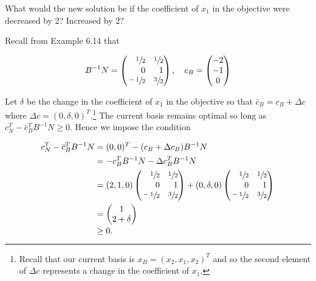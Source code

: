 What would the new solution be if the coefficient of $x_1$ in the objective were decreased by 2? Increased by 2?

\begin{solution}
  Recall from Example 6.14 that

  $$
  B^{-1} N = \begin{pmatrix*}[r]
     \sfrac{1}{2} & \sfrac{1}{2} \\
                0 &            1 \\
     \sfrac{-1}{2} & \sfrac{3}{2}
  \end{pmatrix*}, \quad c_B = \begin{pmatrix*}
    -2 \\
    -1 \\
     0
  \end{pmatrix*}
  $$

  Let $\delta$ be the change in the coefficient of $x_1$ in the objective so that $\bar{c}_B = c_B + \Delta c$ where 
  $\Delta c = (0, \delta, 0)^T$.\footnote{
    Recall that our current basis is $x_B = (x_2, x_1, x_2)^T$ and so the second element of $\Delta c$ represents a 
    change in the coefficient of $x_1$.
  } The current basis remains optimal so long as \linebreak
  $c_N^T - \bar{c}_B^T B^{-1} N \ge 0 $. Hence we impose the condition

  \begin{align*}
    c_N^T - \bar{c}_B^T B^{-1} N &= (0, 0)^T - (c_B + \Delta c_B) B^{-1} N \\
                                 &= -c_B^T B^{-1} N - \Delta c_B^T B^{-1} N \\
                                 &= (2, 1, 0) \begin{pmatrix*}[r]
                                        \sfrac{1}{2}  & \sfrac{1}{2} \\
                                                   0  &            1 \\
                                        \sfrac{-1}{2} & \sfrac{3}{2}
                                    \end{pmatrix*} + (0, \delta, 0) \begin{pmatrix*}[r]
                                        \sfrac{1}{2}  & \sfrac{1}{2} \\
                                                   0  &            1 \\
                                        \sfrac{-1}{2} & \sfrac{3}{2}
                                    \end{pmatrix*} \\
                                 &= \begin{pmatrix*}
                                      1 \\
                                      2 + \delta
                                    \end{pmatrix*} \\
                                 &\ge 0.
  \end{align*}


\end{solution}
